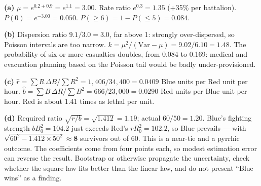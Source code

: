 \documentclass[11pt]{article}
\begin{document}
\begin{soln}\textbf{(a)} $\mu=e^{0.2+0.9}=e^{1.1}=\mathbf{3.00}$. Rate ratio $e^{0.3}=\mathbf{1.35}$ (+35\% per battalion). $P(0)=e^{-3.00}=\mathbf{0.050}$. $P(\ge6)=1-P(\le5)=\mathbf{0.084}$.

\textbf{(b)} Dispersion ratio $9.1/3.0=3.0$, far above 1: strongly over-dispersed, so Poisson intervals are too narrow. $k=\mu^2/(\text{Var}-\mu)=9.02/6.10=\mathbf{1.48}$. The probability of six or more casualties doubles, from 0.084 to 0.169: medical and evacuation planning based on the Poisson tail would be badly under-provisioned.

\textbf{(c)} $\hat r=\sum R\,\Delta B/\sum R^2=1{,}406/34{,}400=\mathbf{0.0409}$ Blue units per Red unit per hour. $\hat b=\sum B\,\Delta R/\sum B^2=666/23{,}000=\mathbf{0.0290}$ Red units per Blue unit per hour. Red is about 1.41 times as lethal per unit.

\textbf{(d)} Required ratio $\sqrt{r/b}=\sqrt{1.412}=1.19$; actual $60/50=1.20$. Blue's fighting strength $bB_0^2=104.2$ just exceeds Red's $rR_0^2=102.2$, so Blue prevails --- with $\sqrt{60^2-1.412\times50^2}\approx\mathbf{8}$ survivors out of 60. This is a near-tie and a pyrrhic outcome. The coefficients come from four points each, so modest estimation error can reverse the result. Bootstrap or otherwise propagate the uncertainty, check whether the square law fits better than the linear law, and do not present ``Blue wins'' as a finding.\end{soln}
\end{document}
